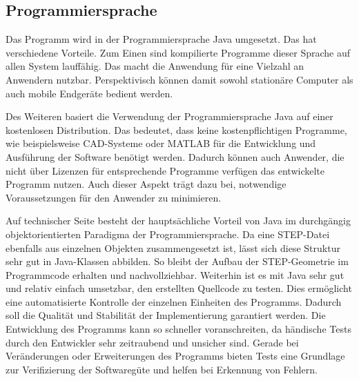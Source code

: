 \subsection{Programmiersprache} 
 
Das Programm wird in der Programmiersprache Java umgesetzt. Das hat verschiedene Vorteile. Zum Einen sind kompilierte Programme dieser Sprache auf allen System lauffähig. Das macht die Anwendung für eine Vielzahl an Anwendern nutzbar. Perspektivisch können damit sowohl stationäre Computer als auch mobile Endgeräte bedient werden.

Des Weiteren basiert die Verwendung der Programmiersprache Java auf einer kostenlosen Distribution. Das bedeutet, dass keine kostenpflichtigen Programme, wie beispielsweise CAD-Systeme oder MATLAB für die Entwicklung und Ausführung der Software benötigt werden. Dadurch können auch Anwender, die nicht über Lizenzen für entsprechende Programme verfügen das entwickelte Programm nutzen. Auch dieser Aspekt trägt dazu bei, notwendige Voraussetzungen für den Anwender zu minimieren.

Auf technischer Seite besteht der hauptsächliche Vorteil von Java im durchgängig objektorientierten Paradigma der Programmiersprache. Da eine STEP-Datei ebenfalls aus einzelnen Objekten zusammengesetzt ist, lässt sich diese Struktur sehr gut in Java-Klassen abbilden. So bleibt der Aufbau der STEP-Geometrie im Programmcode erhalten und nachvollziehbar. 
Weiterhin ist es mit Java sehr gut und relativ einfach umsetzbar, den erstellten Quellcode zu testen. Dies ermöglicht eine automatisierte Kontrolle der einzelnen Einheiten des Programms. Dadurch soll die Qualität und Stabilität der Implementierung garantiert werden. Die Entwicklung des Programms kann so schneller voranschreiten, da händische Tests durch den Entwickler sehr zeitraubend und unsicher sind. Gerade bei Veränderungen oder Erweiterungen des Programms bieten Tests eine Grundlage zur Verifizierung der Softwaregüte und helfen bei Erkennung von Fehlern.     




       
 